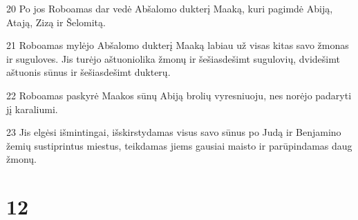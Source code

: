 \par 20 Po jos Roboamas dar vedė Abšalomo dukterį Maaką, kuri pagimdė Abiją, Atają, Zizą ir Šelomitą. 
\par 21 Roboamas mylėjo Abšalomo dukterį Maaką labiau už visas kitas savo žmonas ir suguloves. Jis turėjo aštuoniolika žmonų ir šešiasdešimt sugulovių, dvidešimt aštuonis sūnus ir šešiasdešimt dukterų. 
\par 22 Roboamas paskyrė Maakos sūnų Abiją brolių vyresniuoju, nes norėjo padaryti jį karaliumi. 
\par 23 Jis elgėsi išmintingai, išskirstydamas visus savo sūnus po Judą ir Benjamino žemių sustiprintus miestus, teikdamas jiems gausiai maisto ir parūpindamas daug žmonų.



\chapter{12}

